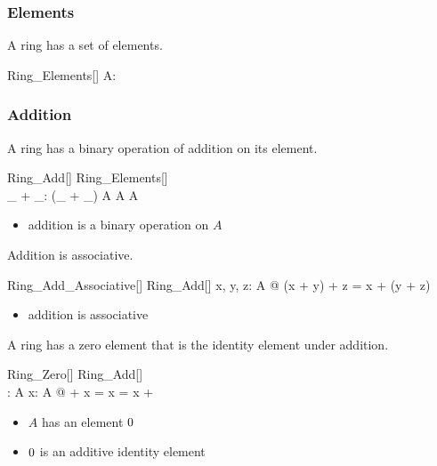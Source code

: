 \documentclass{amsart}
\begin{document}
\subsubsection{Elements}

A ring has a set of elements.

\begin{schema}{Ring\_Elements}[\genT]
	A: \power \genT
\end{schema}

\subsubsection{Addition}

A ring has a binary operation of addition on its element.

\begin{schema}{Ring\_Add}[\genT]
	Ring\_Elements[\genT] \\
	\_ + \_: \genT \cross \genT \pfun \genT
\where
	(\_ + \_) \in A \cross A \fun A
\end{schema}

\begin{itemize}
	\item addition is a binary operation on $A$
\end{itemize}

Addition is associative.

\begin{schema}{Ring\_Add\_Associative}[\genT]
	Ring\_Add[\genT]
\where
	\forall x, y, z: A @ (x + y) + z = x + (y + z)
\end{schema}

\begin{itemize}
	\item addition is associative
\end{itemize}

A ring has a zero element that is the identity element under addition.

\begin{schema}{Ring\_Zero}[\genT]
	Ring\_Add[\genT] \\
	\ringZero: \genT
\where
	\ringZero \in A
\also
	\forall x: A @ \ringZero + x = x = x + \ringZero
\end{schema}

\begin{itemize}
	\item $A$ has an element $0$
	\item $0$ is an additive identity element
\end{itemize}
\end{document}
